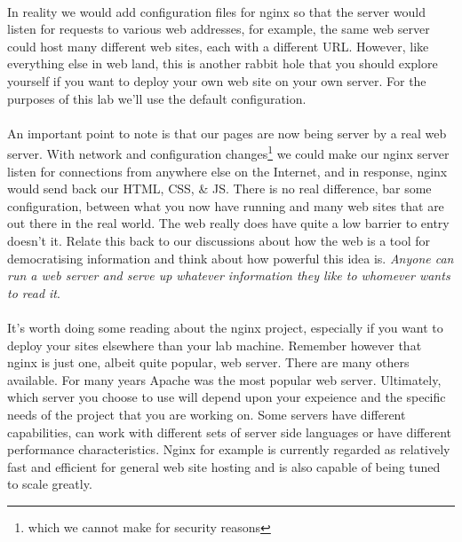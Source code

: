\documentclass[10pt, a4paper, twosize]{article}
\begin{document}
\paragraph{} In reality we would add configuration files for nginx so that the server would listen for requests to various web addresses, for example, the same web server could host many different web sites, each with a different URL. However, like everything else in web land, this is another rabbit hole that you should explore yourself if you want to deploy your own web site on your own server. For the purposes of this lab we'll use the default configuration.

\paragraph{} An important point to note is that our pages are now being server by a real web server. With network and configuration changes\footnote{which we cannot make for security reasons} we could make our nginx server listen for connections from anywhere else on the Internet, and in response, nginx would send back our HTML, CSS, \& JS. There is no real difference, bar some configuration, between what you now have running and many web sites that are out there in the real world. The web really does have quite a low barrier to entry doesn't it. Relate this back to our discussions about how the web is a tool for democratising information and think about how powerful this idea is. \emph{Anyone can run a web server and serve up whatever information they like to whomever wants to read it}.

\paragraph{} It's worth doing some reading about the nginx project, especially if you want to deploy your sites elsewhere than your lab machine. Remember however that nginx is just one, albeit quite popular, web server. There are many others available. For many years Apache was the most popular web server. Ultimately, which server you choose to use will depend upon your expeience and the specific needs of the project that you are working on. Some servers have different capabilities, can work with different sets of server side languages or have different performance characteristics. Nginx for example is currently regarded as relatively fast and efficient for general web site hosting and is also capable of being tuned to scale greatly.
\end{document}
